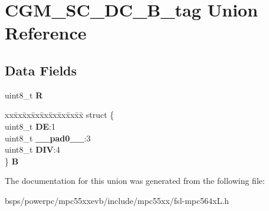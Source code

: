 \hypertarget{unionCGM__SC__DC__8B__tag}{}\section{C\+G\+M\+\_\+\+S\+C\+\_\+\+D\+C\+\_\+B\+\_\+tag Union Reference}
\label{unionCGM__SC__DC__8B__tag}
\subsection*{Data Fields}
\begin{DoxyCompactItemize}
\item 
\mbox{\label{unionCGM__SC__DC__8B__tag_aeeac5324a3be57664c3853ac117e8853}} 
uint8\+\_\+t {\bfseries R}
\item 
\mbox{\label{unionCGM__SC__DC__8B__tag_a06120b9bdcf60fae6db607de127cc00f}} 
\begin{tabbing}
xx\=xx\=xx\=xx\=xx\=xx\=xx\=xx\=xx\=\kill
struct \{\\
\>uint8\_t {\bfseries DE}:1\\
\>uint8\_t {\bfseries \_\_pad0\_\_}:3\\
\>uint8\_t {\bfseries DIV}:4\\
\} {\bfseries B}\\

\end{tabbing}\end{DoxyCompactItemize}


The documentation for this union was generated from the following file\+:\begin{DoxyCompactItemize}
\item 
bsps/powerpc/mpc55xxevb/include/mpc55xx/fsl-\/mpc564x\+L.\+h\end{DoxyCompactItemize}
